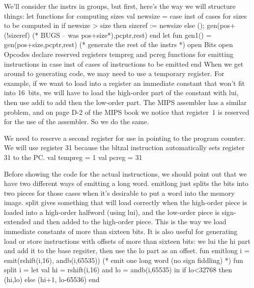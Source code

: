 We'll consider the \code{}instrs\edoc{} in groups, but first, here's the
way we will structure things:
\enddocs
{}
\endmoddef
let \LA{}functions for computing sizes\RA{}
    val newsize = case inst of
        \LA{}cases for sizes to be computed\RA{}
in  if newsize > size then sizeref := newsize else ();
    gen(pos+(!sizeref) (* BUGS -- was pos+size*),pcptr,rest)
end
\endcode
{}
\endmoddef
let fun gen1() = gen(pos+size,pcptr,rest) 
                                (* generate the rest of the \code{}instr\edoc{}s *)
    open Bits
    open Opcodes
    \LA{}declare reserved registers \code{}tempreg\edoc{} and \code{}pcreg\edoc{}\RA{}
    \LA{}functions for emitting instructions\RA{}
in  case inst of
    \LA{}cases of instructions to be emitted\RA{}
end
\endcode
{}
When we get around to generating code, we may need to use a temporary
register.
For example, if we want to load into a register
an immediate constant that won't fit
into 16~bits, we will have to load the high-order part of the constant
with \code{}lui\edoc{}, then use \code{}addi\edoc{} to add then the low-order part.
The MIPS assembler has a similar problem, and on page D-2 of
the MIPS book we notice that register~1 is reserved for the use of the
assembler.
So we do the same.

We need to reserve a second register for use in pointing to the program 
counter.
We will use register 31 because the \code{}bltzal\edoc{} instruction automatically
sets register 31 to the PC.
\enddocs
{}
\endmoddef
val tempreg = 1
val pcreg = 31
\endcode
{}

Before showing the code for the actual instructions, we should
point out that
we have two different ways of emitting a long word.
\code{}emitlong\edoc{} just splits the bits into two pieces for those cases
when it's desirable to put a word into the memory image.
\code{}split\edoc{} gives something that will load correctly
when the high-order piece is loaded into a high-order halfword
(using \code{}lui\edoc{}),
and the low-order piece is sign-extended and then added to the 
high-order piece.
This is the way we load immediate constants of more than sixteen bits.
It is also useful for generating load or store instructions with
offsets of more than sixteen bits: we \code{}lui\edoc{} the \code{}hi\edoc{} part and
add it to the base regsiter, then use the \code{}lo\edoc{} part as an offset.
\enddocs
{}
\endmoddef
fun emitlong i = emit(rshift(i,16), andb(i,65535))
                                (* emit one long word (no sign fiddling) *)
fun split i = let val hi = rshift(i,16) and lo = andb(i,65535)
                     in if lo<32768 then (hi,lo) else (hi+1, lo-65536)
                    end

